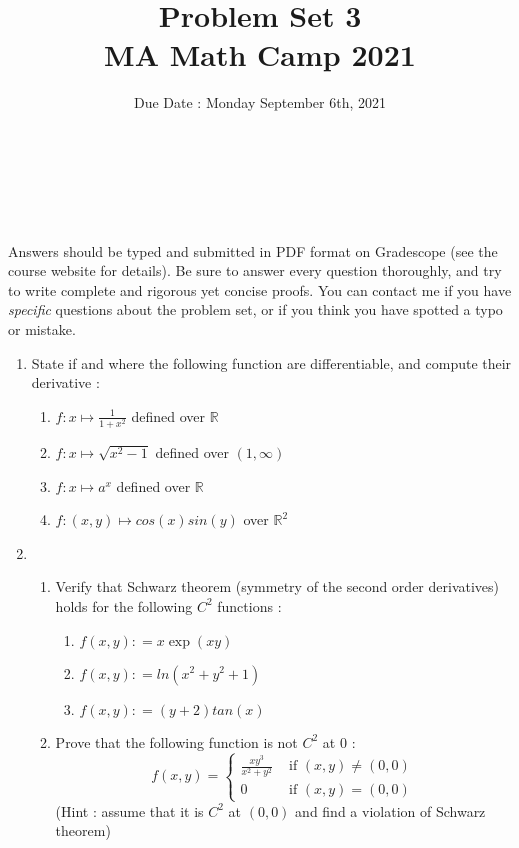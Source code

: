 \documentclass[11pt,letterpaper]{scrartcl}
\title{Problem Set 3 \\ MA Math Camp 2021 }
\author{ Due Date : Monday September 6th, 2021 }
\date{  }
\makeatletter
\newcommand{\reals}{\mathbb{R}}
\let\thetitle\@title
\let\theauthor\@author
\let\thedate\@date
\newcommand\makesimpletitle{%
\noindent 
\textbf{\large \thetitle} \\
\-\ \hspace{.2cm} { \large \theauthor } \\ 
\-\ \hspace{.2cm} { \normalsize \thedate }
}
\makeatother
\begin{document}


\makesimpletitle

Answers should be typed and submitted in PDF format on Gradescope (see the course website for details). Be sure to answer every question thoroughly, and try to write complete and rigorous yet concise proofs. You can contact me if you have \emph{specific} questions about the problem set, or if you think you have spotted a typo or mistake.

\vspace{.5cm}

\begin{enumerate}
	
	\item State if and where the following function are differentiable, and compute their derivative :
	\begin{enumerate}
		\item $f : x \mapsto \frac{1}{1+x^2}$ defined over $\reals$
		\item $f : x \mapsto \sqrt{x^2-1}$ defined over $(1,\infty)$
		\item $f : x \mapsto a^x$ defined over $\reals$
		\item $f : (x,y) \mapsto cos(x) sin(y)$ over $\reals^2$
	\end{enumerate}

	\item 
	\begin{enumerate}
		\item Verify that Schwarz theorem (symmetry of the second order derivatives) holds for the following $C^2$ functions :
		\begin{enumerate}
			\item $f(x,y) : = x \exp (xy)$ 
			\item $f(x,y) : = ln(x^2+y^2+1)$
			\item $f(x,y) : = (y+2) tan(x)$
		\end{enumerate}
		\item Prove that the following function is not $C^2$ at $0$ :
		\[
		f(x,y) = \begin{cases}
		\frac{x y^3}{x^2+y^2} & \text{ if } (x,y) \neq (0,0)
		\\
		0 & \text{ if } (x,y) = (0,0)
		\end{cases}
		\]
		(Hint : assume that it is $C^2$ at $(0,0)$ and find a violation of Schwarz theorem)
	\end{enumerate}
	

\end{enumerate}
\end{document}
